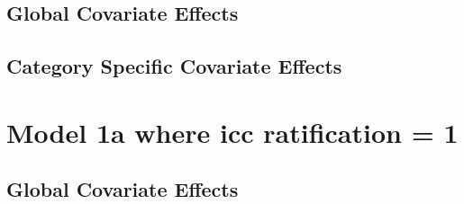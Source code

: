 \documentclass[]{article}
\begin{document}
\subsection{Global Covariate Effects}

\clearpage
\subsection{Category Specific Covariate Effects}

\clearpage

\section{Model 1a where icc ratification = 1}
\subsection{Global Covariate Effects}

\clearpage
\end{document}
